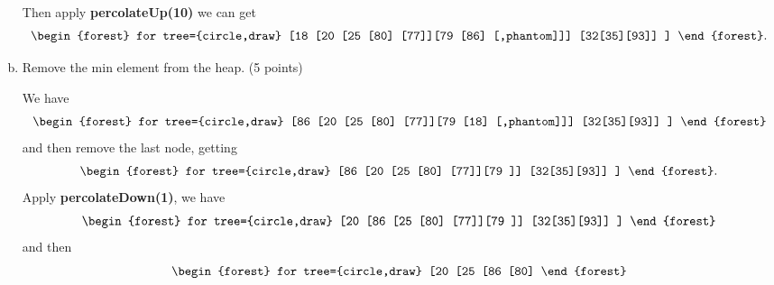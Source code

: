 \documentclass[11pt]{exam}
\begin{document}
\begin{enumerate}[a)]
\begin{solution}
              Then apply \textbf{percolateUp(10)} we can get \[
                  \begin{forest}
                      for tree={circle,draw}
                      [18
                          [20
                                  [25
                                          [80]
                                          [77]][79 [86] [,phantom]]]
                          [32[35][93]]
                      ]
                  \end{forest}. \]
          \end{solution}

    \item Remove the min element from the heap. (5 points)
          \begin{solution}
              We have  \[
                  \begin{forest}
                      for tree={circle,draw}
                      [86
                          [20
                                  [25
                                          [80]
                                          [77]][79 [18] [,phantom]]]
                          [32[35][93]]
                      ]
                  \end{forest} \] and then remove the last node, getting
              \[
                  \begin{forest}
                      for tree={circle,draw}
                      [86
                          [20
                                  [25
                                          [80]
                                          [77]][79 ]]
                          [32[35][93]]
                      ]
                  \end{forest}. \]
              Apply  \textbf{percolateDown(1)}, we have
              \[ \begin{forest}
                      for tree={circle,draw}
                      [20
                          [86
                                  [25
                                          [80]
                                          [77]][79 ]]
                          [32[35][93]]
                      ]
                  \end{forest} \] and then  \[
                  \begin{forest}
                      for tree={circle,draw}
                      [20
                          [25
                                  [86
                                          [80]

\end{forest}\]
\end{solution}
\end{enumerate}
\end{document}
